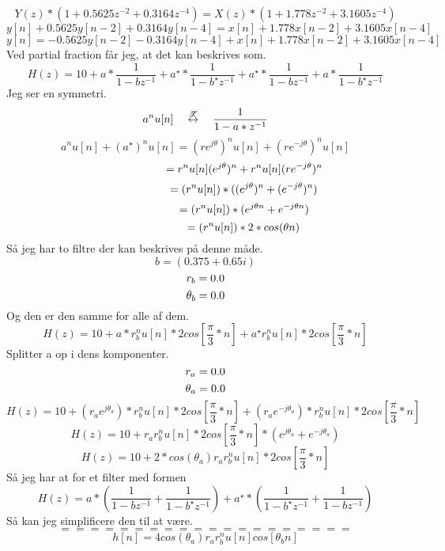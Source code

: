 \begin{Opgaver}
\begin{kapitel}
\begin{Opgave}
            \begin{UnderOpgave}[\text{$H(z) = \filterZto{1, 0, 1.778, 0, 3.1605}{1, 0, 0.5625, 0, 0.3164}$}]
                \[Y(z)*(1 + 0.5625z^{-2} + 0.3164z^{-4}) = X(z) * (1 + 1.778z^{-2} + 3.1605z^{-4})\]
                \[y[n] + 0.5625y[n - 2] + 0.3164y[n - 4] = x[n] + 1.778x[n - 2] + 3.1605x[n - 4]\]
                \[y[n] = - 0.5625y[n - 2] - 0.3164y[n - 4] + x[n] + 1.778x[n - 2] + 3.1605x[n - 4]\]
                Ved partial fraction får jeg, at det kan beskrives som. 
                \[H(z) = 10 + a * \frac{1}{1 - bz^{-1}} + a^\star * \frac{1}{1 - b^\star z^{-1}} + a^\star * \frac{1}{1 - bz^{-1}} + a * \frac{1}{1 - b^\star z^{-1}}\]
                Jeg ser en symmetri. 
                \[a^nu[n] \transformation{Z} \frac{1}{1 - a*z^{-1}}\]
                \[a^nu[n] + (a^\star)^nu[n] = (re^{j\theta})^nu[n] + (re^{-j\theta})^nu[n]\]
                \[\tab{6}                   = r^nu[n](e^{j\theta})^n + r^nu[n](re^{-j\theta})^n\]
                \[\tab{6}                   = (r^nu[n])*((e^{j\theta})^n + (e^{-j\theta})^n)\]
                \[\tab{6}                   = (r^nu[n])*(e^{j\theta n} + e^{-j\theta n})\]
                \[\tab{6}                   = (r^nu[n])* 2 * cos(\theta n)\]
                Så jeg har to filtre der kan beskrives på denne måde. 
                \[b = (0.375 + 0.65i)\]
                 \edef\radius{\pgfmathresult}
                 \edef\vinkel{\pgfmathresult}
                \[r_b = \radius\]
                \[\theta_b = \vinkel\] 
                Og den er den samme for alle af dem. 
                \[H(z) = 10 + a * r_b^nu[n] * 2cos[\frac{\pi}{3} * n] + a^\star r_b^nu[n] * 2cos[\frac{\pi}{3} * n]\]
                Splitter a op i dens komponenter. 
                 \edef\radius{\pgfmathresult}
                 \edef\vinkel{\pgfmathresult} %
                \[r_a = \radius\]
                \[\theta_a = \vinkel\] 
                \[H(z) = 10 + (r_a e^{j\theta_a}) * r_b^nu[n] * 2cos[\frac{\pi}{3} * n] + (r_a e^{-j\theta_a}) * r_b^nu[n] * 2cos[\frac{\pi}{3} * n]\]
                \[H(z) = 10 + r_a r_b^nu[n] * 2cos[\frac{\pi}{3}*n] * (e^{j\theta_a} + e^{-j\theta_a})\]
                \[H(z) = 10 + 2 * cos(\theta_a) r_a r_b^nu[n] * 2cos[\frac{\pi}{3}*n]\]
                Så jeg har at for et filter med formen 
                \[H(z) = a * (\frac{1}{1 - bz^{-1}} + \frac{1}{1 - b^\star z^{-1}}) + a^\star * ( \frac{1}{1 - b^\star z^{-1}} + \frac{1}{1 - bz^{-1}})\]
                Så kan jeg simplificere den til at være. 
                \[====================\]
                \[h[n] = 4 cos(\theta_a) r_a r_b^nu[n] cos[\theta_b n]\]
                

\end{UnderOpgave}
\end{Opgave}
\end{kapitel}
\end{Opgaver}
